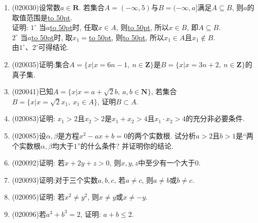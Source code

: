 \documentclass[10pt,a4paper]{article}
\newcommand{\blank}[1]{\underline{\hbox to #1pt{}}}
\begin{document}
\begin{enumerate}[1.]
\item {\tiny (020030)}设常数$a\in \mathbf{R}$. 若集合$A=(-\infty ,5)$与$B=(-\infty ,a]$满足$A\subseteq B$, 则$a$的取值范围是\blank{50}.\\
证明: $1^\circ$ 当$a$\blank{50}时, 任取$x\in A$, 则\blank{50}, 所以$x\in B$, 即$A\subseteq B$.\\ 
$2^\circ$ 当$a$\blank{50}时, 取$x_1=$\blank{50}, 则\blank{50}, 所以$x_1\in A$且$x_1\not \in B$.\\
由$1^\circ$、$2^\circ$可得结论.
\item {\tiny (020035)}证明:集合$A=\{x|x=6n-1, \ n\in\mathbf{Z}\}$是$B=\{x|x=3n+2, \ n\in\mathbf{Z}\}$的真子集.
\n\vspace*{16ex}
\item {\tiny (020041)}已知$A=\{x|x=a+\sqrt 2b,\ a,b\in \mathbf{N}\}$, 若集合$B=\{x|x=\sqrt 2x_1,\  x_1 \in A\}$, 证明$B\subset A$.
\n\vspace*{24ex}
\item {\tiny (020083)}证明: $x_1>2$且$x_2>2$是$x_1+x_2>4$且$x_1\cdot x_2>4$的充分非必要条件.
\item {\tiny (020085)}设$\alpha,\beta$是方程$x^2-ax+b=0$的两个实数根. 试分析$a>2$且$b>1$是``两个实数根$\alpha,\beta$均大于$1$''的什么条件? 并证明你的结论.
\item {\tiny (020092)}证明: 若$x+2y+z>0$, 则$x,y,z$中至少有一个大于$0$.
\item {\tiny (020093)}证明:对于三个实数$a,b,c$, 若$a\ne c$, 则$a\ne b$或$b\ne c$.
\item {\tiny (020095)}证明: 若$x^2\ne y^2$, 则$x\ne y$或$x\ne -y$.
\item {\tiny (020096)}若$a^3+b^3=2$, 证明: $a+b\le 2$.
\end{enumerate}
\end{document}

